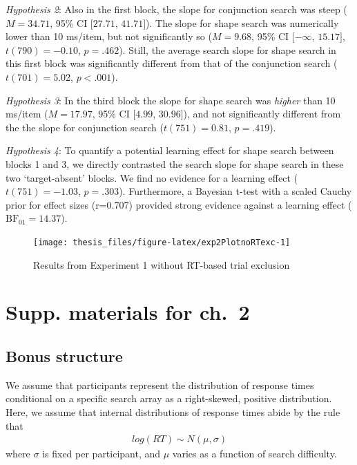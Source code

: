 \documentclass[12pt,twoside]{reedthesis}
\begin{document}
\emph{Hypothesis 2}: Also in the first block, the slope for conjunction search was steep (\(M = 34.71\), 95\% CI \([27.71\), \(41.71]\)). The slope for shape search was numerically lower than 10 ms/item, but not significantly so (\(M = 9.68\), 95\% CI \([-\infty\), \(15.17]\), \(t(790) = -0.10\), \(p = .462\)). Still, the average search slope for shape search in this first block was significantly different from that of the conjunction search (\(t(701) = 5.02\), \(p < .001\)).

\emph{Hypothesis 3}: In the third block the slope for shape search was \emph{higher} than 10 ms/item (\(M = 17.97\), 95\% CI \([4.99\), \(30.96]\)), and not significantly different from the the slope for conjunction search (\(t(751) = 0.81\), \(p = .419\)).

\emph{Hypothesis 4}: To quantify a potential learning effect for shape search between blocks 1 and 3, we directly contrasted the search slope for shape search in these two `target-absent' blocks. We find no evidence for a learning effect (\(t(751) = -1.03\), \(p = .303\)). Furthermore, a Bayesian t-test with a scaled Cauchy prior for effect sizes (r=0.707) provided strong evidence against a learning effect (\(\mathrm{BF}_{\textrm{01}} = 14.37\)).
\begin{figure}
\texttt{[image: thesis\_files/figure-latex/exp2PlotnoRTexc-1]} \caption{Results from Experiment 1 without RT-based trial exclusion}\label{fig:exp2PlotnoRTexc}
\end{figure}
\hypertarget{supp.-materials-for-ch.-2}{%
\chapter{Supp. materials for ch.~2}\label{supp.-materials-for-ch.-2}}

\hypertarget{app2-bonus}{%
\section{Bonus structure}\label{app2-bonus}}

We assume that participants represent the distribution of response times conditional on a specific search array as a right-skewed, positive distribution. Here, we assume that internal distributions of response times abide by the rule that
\begin{align}
    log(RT) \sim N(\mu, \sigma)
\end{align}
where \(\sigma\) is fixed per participant, and \(\mu\) varies as a function of search difficulty.
\end{document}
